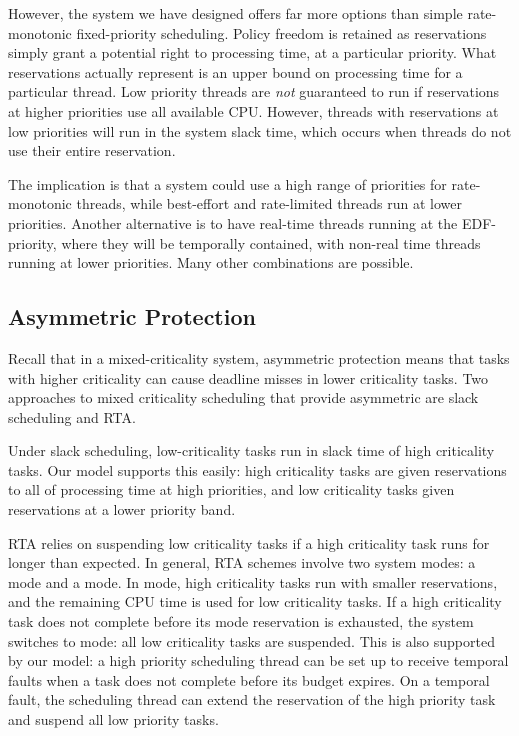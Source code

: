 However, the system we have designed offers far more options than simple rate-monotonic fixed-priority
scheduling.  Policy freedom is retained as reservations simply grant a potential right to processing
time, at a particular priority.  What reservations actually represent is an upper bound on
processing time for a particular thread.  Low priority threads are \emph{not} guaranteed to run if
reservations at higher priorities use all available CPU.  However, threads with reservations at low
priorities will run in the system slack time, which occurs when threads do not use their entire
reservation.

The implication is that a system could use a high range of priorities for rate-monotonic threads,
while best-effort and rate-limited threads run at lower priorities.  Another alternative is to have
real-time threads running at the EDF-priority, where they will be temporally contained, with
non-real time threads running at lower priorities.  Many other combinations are possible.

\subsection{Asymmetric Protection}

Recall that in a mixed-criticality system, asymmetric protection means that tasks with higher
criticality can cause deadline misses in lower criticality tasks.  Two approaches to mixed
criticality scheduling that provide asymmetric are slack scheduling and
\gls{RTA}\citet{Burns_Davis_14}.

Under slack scheduling, low-criticality tasks run in slack time of high criticality tasks.  Our
model supports this easily: high criticality tasks are given reservations to all of processing time at
high priorities, and low criticality tasks given reservations at a lower priority band.

\gls{RTA} relies on suspending low criticality tasks if a high criticality task runs for longer than
expected.  In general, \gls{RTA} schemes involve two system modes: a  mode and a 
mode.  In  mode, high criticality tasks run with smaller reservations, and the remaining
CPU time is used for low criticality tasks.  If a high criticality task does not complete before its
 mode reservation is exhausted, the system switches to  mode: all low criticality
tasks are suspended.  This is also supported by our model: a high priority scheduling thread can be
set up to receive temporal faults when a task does not complete before its budget expires.  On a
temporal fault, the scheduling thread can extend the reservation of the high priority task and
suspend all low priority tasks.

